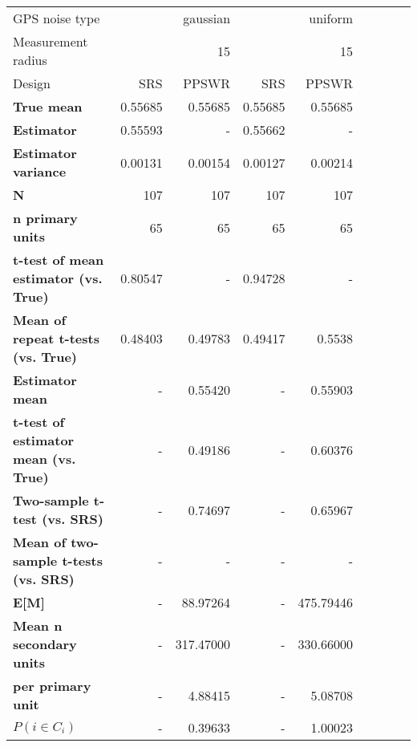 \begin{tabular}{l|r|rrr|r|rrr}
\toprule
GPS noise type & \multicolumn{2}{r}{gaussian} & \multicolumn{2}{r}{uniform} \\
Measurement radius &  & 15 &  & 15 \\
Design & SRS & PPSWR & SRS & PPSWR \\
\midrule
\textbf{True mean} &  0.55685 &  0.55685 &  0.55685 &  0.55685 \\
\textbf{Estimator} & 0.55593 & - & 0.55662 & - \\
\textbf{Estimator variance} & 0.00131 & 0.00154 & 0.00127 & 0.00214 \\
\textbf{N} & 107 & 107 & 107 & 107 \\
\textbf{n primary units} & 65 & 65 & 65 & 65 \\
\textbf{t-test of mean estimator (vs. True)} & 0.80547 & - & 0.94728 & - \\
\textbf{Mean of repeat t-tests (vs. True)} & 0.48403 & 0.49783 & 0.49417 & 0.5538 \\
\textbf{Estimator mean} & - & 0.55420 & - & 0.55903 \\
\textbf{t-test of estimator mean (vs. True)} & - & 0.49186 & - & 0.60376 \\
\textbf{Two-sample t-test (vs. SRS)} & - & 0.74697 & - & 0.65967 \\
\textbf{Mean of two-sample t-tests (vs. SRS)} & - & - & - & - \\
\textbf{E[M]} & - & 88.97264 & - & 475.79446 \\
\textbf{Mean n secondary units} & - & 317.47000 & - & 330.66000 \\
\textbf{     per primary unit} & - & 4.88415 & - & 5.08708 \\
\textbf{$P(i \in C_i)$} & - & 0.39633 & - & 1.00023 \\
\bottomrule
\end{tabular}

